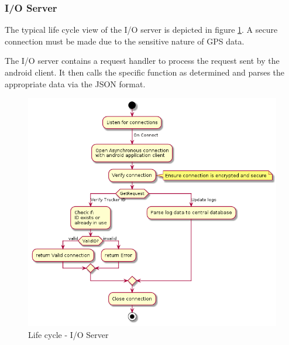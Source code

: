 \pagebreak
\subsubsection{I/O Server}
The typical life cycle view of the I/O server is depicted in figure \ref{fig:IO_activity}.
A secure connection must be made due to the sensitive nature of GPS data.

The I/O server contains a request handler to process the request sent by the android client.
It then calls the specific function as determined and parses the appropriate data via the JSON format.
\begin{figure}[H]
\centering
\includegraphics[width=6in]{IO_activity.png}
\caption{Life cycle - I/O Server}
\label{fig:IO_activity}
\end{figure}

